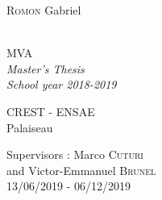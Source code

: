 \documentclass[12pt]{report}
\theoremstyle{definition}
\theoremstyle{remark}
\begin{document}
\thispagestyle{empty}
\noindent
\begin{minipage}{0.5\textwidth}
  \begin{flushleft} \Large
    \textsc{Romon} Gabriel\\
    \hfill\\
    \hfill
  \end{flushleft}
\end{minipage}
\noindent
\begin{minipage}{0.5\textwidth}
  \begin{flushright} 
  \Large
    MVA\\
    \textit{Master's Thesis}\\
    \textit{School year 2018-2019}
  \end{flushright}
\end{minipage}

 \vspace*{5cm}

\begin{center}
\end{center}

\vfill
\noindent
\begin{minipage}{0.5\textwidth}
  \begin{flushleft} \Large
    CREST - ENSAE\\
    Palaiseau\\
    \hfill
  \end{flushleft}
\end{minipage}
\noindent
\begin{minipage}{0.5\textwidth}
  \begin{flushright} \Large
    Supervisors : Marco \textsc{Cuturi}\\
    and Victor-Emmanuel \textsc{Brunel}\\
    13/06/2019 - 06/12/2019
  \end{flushright}
\end{minipage} 

\restoregeometry
\newpage\phantom{blabla}
\end{document}

